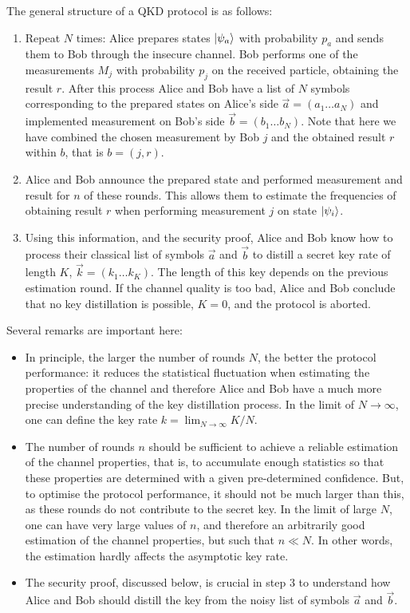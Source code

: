 \documentclass[a4paper]{article}
\begin{document}
The general structure of a QKD protocol is as follows:
\begin{enumerate}
    \item Repeat $N$ times: Alice prepares states $|\psi_a\rangle$ with probability $p_a$ and sends them to Bob through the insecure channel. Bob performs one of the measurements $M_j$ with probability $p_j$ on the received particle, obtaining the result $r$. After this process Alice and Bob have a list of $N$ symbols corresponding to the prepared states on Alice's side $\vec a=(a_1\ldots a_N)$ and implemented measurement on Bob's side $\vec b=(b_1\ldots b_N)$. Note that here we have combined the chosen measurement by Bob $j$ and the obtained result $r$ within $b$, that is $b=(j,r)$.
    \item Alice and Bob announce the prepared state and performed measurement and result for $n$ of these rounds. This allows them to estimate the frequencies of obtaining result $r$ when performing measurement $j$ on state $|\psi_i\rangle$.
    \item Using this information, and the security proof, Alice and Bob know how to process their classical list of symbols $\vec a$ and $\vec b$ to distill a secret key rate of length $K$, $\vec k=(k_1\ldots k_K)$. The length of this key depends on the previous estimation round. If the channel quality is too bad, Alice and Bob conclude that no key distillation is possible, $K=0$, and the protocol is aborted. 
\end{enumerate}
Several remarks are important here:
\begin{itemize}
\item In principle, the larger the number of rounds $N$, the better the protocol performance: it reduces the statistical fluctuation when estimating the properties of the channel and therefore Alice and Bob have a much more precise understanding of the key distillation process. In the limit of $N\rightarrow\infty$, one can define the key rate $k=\lim_{N\rightarrow\infty} K/N$.
\item The number of rounds $n$ should be sufficient to achieve a reliable estimation of the channel properties, that is, to accumulate enough statistics so that these properties are determined with a given pre-determined confidence. But, to optimise the protocol performance, it should not be much larger than this, as these rounds do not contribute to the secret key. In the limit of large $N$, one can have very large values of $n$, and therefore an arbitrarily good estimation of the channel properties, but such that $n\ll N$. In other words, the estimation hardly affects the asymptotic key rate.
\item The security proof, discussed below, is crucial in step 3 to understand how Alice and Bob should distill the key from the noisy list of symbols $\vec a$ and $\vec b$.
\end{itemize}
\end{document}

